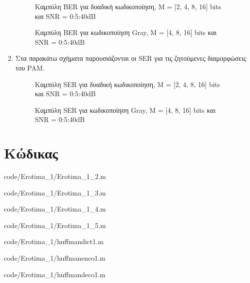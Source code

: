 \documentclass{article}
\begin{document}
\begin{enumerate}
        \begin{figure}[H]
        \caption{Καμπύλη BER για δυαδική κωδικοποίηση, M = [2, 4, 8, 16] bits και SNR = 0:5:40dB}
        \end{figure}
        \begin{figure}[H]
        \caption{Καμπύλη BER για κωδικοποίηση Gray, M = [4, 8, 16] bits και SNR = 0:5:40dB}
        \end{figure}
        
    \newpage 
    
    \item Στα παρακάτω σχήματα παρουσιάζονται οι SER για τις ζητούμενες διαμορφώσεις του PAM.
        \begin{figure}[H]
        \caption{Καμπύλη SER για δυαδική κωδικοποίηση, M = [2, 4, 8, 16] bits και SNR = 0:5:40dB}
        \end{figure}
        \begin{figure}[H]
        \caption{Καμπύλη SER για κωδικοποίηση Gray, M = [4, 8, 16] bits και SNR = 0:5:40dB}
        \end{figure}
    \end{enumerate}

\newpage

\section{Κώδικας}
    
    {code/Erotima_1/Erotima_1_2.m}
    
    {code/Erotima_1/Erotima_1_3.m}
    
    {code/Erotima_1/Erotima_1_4.m}
    
    {code/Erotima_1/Erotima_1_5.m}
    
    {code/Erotima_1/huffmandict1.m}
    
    {code/Erotima_1/huffmanenco1.m}
    
    {code/Erotima_1/huffmandeco1.m}
    
\end{document}
